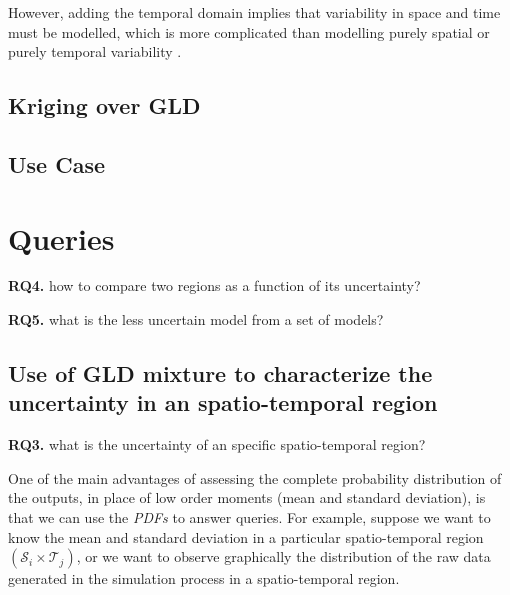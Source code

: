 However, adding the temporal domain implies that variability in space and time must be modelled, which is more complicated than modelling purely spatial or purely temporal variability \cite{Graler2016}.

\subsection{Kriging over GLD}

\subsection{Use Case}

\section{Queries}

\begin{tcolorbox}
\textbf{RQ4.} how to compare two regions as a function of its uncertainty?
\end{tcolorbox}

\begin{tcolorbox}
\textbf{RQ5.} what is the less uncertain model from a set of models?
\end{tcolorbox}


\subsection{Use of GLD mixture to characterize the uncertainty in an spatio-temporal region}
\label{sub:gldMixtureWorkflow}

\begin{tcolorbox}
\textbf{RQ3.} what is the uncertainty of an specific spatio-temporal region?
\end{tcolorbox}

One of the main advantages of assessing the complete probability distribution of the outputs, in place of low order moments (mean and standard deviation), is that we can use the \textit{PDFs} to answer queries. For example, suppose we want to know the mean and standard deviation in a particular spatio-temporal region $(\mathcal{S}_{i} \times \mathcal{T}_{j})$, or we want to observe graphically the distribution of the raw data generated in the simulation process in a spatio-temporal region. 


